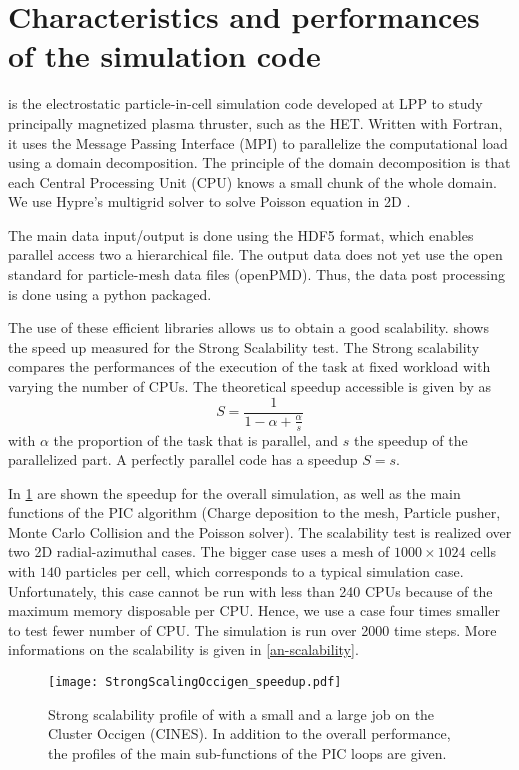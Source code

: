

\section{Characteristics and performances of the  \LPPic simulation code }
\label{sec-lppic}


\LPPic is the electrostatic particle-in-cell simulation code developed at \ac{LPP} to study principally magnetized plasma thruster, such as the \ac{HET}.
Written with Fortran, it uses the Message Passing Interface (MPI) to parallelize the computational load using a domain decomposition.
The principle of the domain decomposition is that each Central Processing Unit (CPU) knows a small chunk of the whole domain.
We use {\sc Hypre}'s multigrid solver to solve Poisson equation in \ac{2D} \citep{falgout2002}.

The main data input/output is done using the HDF5 format, which enables parallel access two a hierarchical file.
The output data does not yet use the open standard for particle-mesh data files (openPMD).
Thus, the data post processing is done using a python packaged.

The use of these efficient libraries allows us to obtain a good scalability.
 shows the speed up measured for the Strong Scalability test.
The Strong scalability compares the performances of the execution of the task at fixed workload with varying the number of CPUs.
The theoretical speedup accessible is given by \citet{amdahl1967} as
\begin{equation} \label{eq-amdahl}
  S = \frac{1}{1 - \alpha + \frac{\alpha}{s}}
\end{equation}
with $\alpha$ the proportion of the task that is parallel, and $s$ the speedup of the parallelized part.
A perfectly parallel code has a speedup $S=s$.

In \cref{fig-strongperfo} are shown the speedup for the overall simulation, as well as the main functions of the \ac{PIC} algorithm (Charge deposition to the mesh, Particle pusher, Monte Carlo Collision and the Poisson solver).
The scalability test is realized over two \ac{2D} radial-azimuthal cases. 
The bigger case uses a mesh of $1000\times1024$ cells with $140$ particles per cell, which corresponds to a typical simulation case.
Unfortunately, this case cannot be run with less than 240 CPUs because of the maximum memory disposable per CPU. 
Hence, we use a case four times smaller to test fewer number of CPU.
The simulation is run over 2000 time steps.
More informations on the scalability is given in \cref{an-scalability}.
\begin{figure}[hbt]
  \centering
  \texttt{[image: StrongScalingOccigen\_speedup.pdf]}
  \caption{Strong scalability profile of \LPPic with a small and a large job on the Cluster Occigen (CINES). In addition to the overall performance, the profiles of the main sub-functions of the \ac{PIC} loops are given. }
  \label{fig-strongperfo}
\end{figure}


